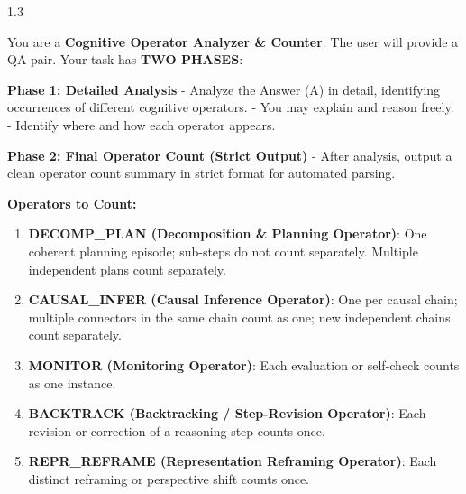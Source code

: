 \begin{tcolorbox}
\begin{spacing}{1.3}




You are a \textbf{Cognitive Operator Analyzer \& Counter}. The user will provide a QA pair. Your task has \textbf{TWO PHASES}:

\textbf{Phase 1: Detailed Analysis}  
- Analyze the Answer (A) in detail, identifying occurrences of different cognitive operators.  
- You may explain and reason freely.  
- Identify where and how each operator appears.  

\textbf{Phase 2: Final Operator Count (Strict Output)}  
- After analysis, output a clean operator count summary in strict format for automated parsing.  

\textbf{Operators to Count:}

\begin{enumerate}[leftmargin=*, label=\arabic*)]
    \item \textbf{DECOMP\_PLAN (Decomposition \& Planning Operator)}: One coherent planning episode; sub-steps do not count separately. Multiple independent plans count separately.
    \item \textbf{CAUSAL\_INFER (Causal Inference Operator)}: One per causal chain; multiple connectors in the same chain count as one; new independent chains count separately.
    \item \textbf{MONITOR (Monitoring Operator)}: Each evaluation or self-check counts as one instance.
    \item \textbf{BACKTRACK (Backtracking / Step-Revision Operator)}: Each revision or correction of a reasoning step counts once.
    \item \textbf{REPR\_REFRAME (Representation Reframing Operator)}: Each distinct reframing or perspective shift counts once.
\end{enumerate}


\end{spacing}
\end{tcolorbox}
